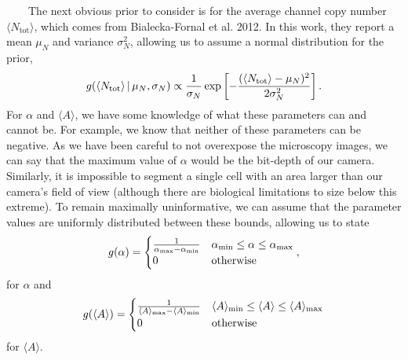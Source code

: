 ~~~~The
next
obvious
prior
to
consider
is for
the
average
channel
copy
number
\(\langle N_\text{tot} \rangle\),
which
comes
from
Bialecka-Fornal
et al.
2012.
In
this
work,
they
report
a mean
\(\mu_N\)
and
variance
\(\sigma_N^2\),
allowing
us to
assume
a
normal
distribution
for
the
prior,
\begin{equation}
g(\langle N_\text{tot}\rangle\,\vert\, \mu_N,\sigma_N) \propto {1 \over \sigma_N}\exp\left[-{(\langle N_\text{tot} \rangle - \mu_N)^2 \over 2 \sigma_N^2}\right].
\label{eq:informative_prior}\end{equation}
For
\(\alpha\)
and
\(\langle A \rangle\),
we
have
some
knowledge
of
what
these
parameters
can
and
cannot
be.
For
example,
we
know
that
neither
of
these
parameters
can be
negative.
As we
have
been
careful
to not
overexpose
the
microscopy
images,
we can
say
that
the
maximum
value
of
\(\alpha\)
would
be the
bit-depth
of our
camera.
Similarly,
it is
impossible
to
segment
a
single
cell
with
an
area
larger
than
our
camera's
field
of
view
(although
there
are
biological
limitations
to
size
below
this
extreme).
To
remain
maximally
uninformative,
we can
assume
that
the
parameter
values
are
uniformly
distributed
between
these
bounds,
allowing
us to
state
\begin{equation}
g(\alpha) = \begin{cases} {1 \over \alpha_\text{max} - \alpha_\text{min}} & \alpha_\text{min} \leq \alpha \leq \alpha_\text{max} \\
0 & \text{otherwise}
\end{cases},
\label{eq:alpha_uniform_prior}\end{equation}
for
\(\alpha\)
and
\begin{equation}
g(\langle A \rangle) = \begin{cases} {1 \over \langle A \rangle_\text{max} - \langle A \rangle_\text{min}} & \langle A \rangle_\text{min} \leq \langle A \rangle \leq \langle A \rangle_\text{max}\\
0 & \text{otherwise}
\end{cases}
\label{eq:area_uniform_prior}\end{equation}
for
\(\langle A \rangle\).

